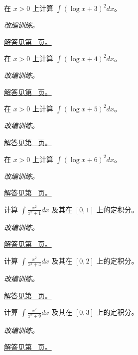 \documentclass[UTF8,12pt,a4paper,fontset=fandol]{ctexart}
\begin{document}
\begin{example}[对数平方的分部积分]\label{ex:c15q15}
在 $x>0$ 上计算 $\displaystyle\int(\log x+3)^2dx$。
\par\textit{改编训练。}\par\hyperref[ans:c15q15]{解答见第~\pageref{ans:c15q15} 页。}
\end{example}
\begin{example}[对数平方的分部积分]\label{ex:c15q16}
在 $x>0$ 上计算 $\displaystyle\int(\log x+4)^2dx$。
\par\textit{改编训练。}\par\hyperref[ans:c15q16]{解答见第~\pageref{ans:c15q16} 页。}
\end{example}
\begin{example}[对数平方的分部积分]\label{ex:c15q17}
在 $x>0$ 上计算 $\displaystyle\int(\log x+5)^2dx$。
\par\textit{改编训练。}\par\hyperref[ans:c15q17]{解答见第~\pageref{ans:c15q17} 页。}
\end{example}
\begin{example}[对数平方的分部积分]\label{ex:c15q18}
在 $x>0$ 上计算 $\displaystyle\int(\log x+6)^2dx$。
\par\textit{改编训练。}\par\hyperref[ans:c15q18]{解答见第~\pageref{ans:c15q18} 页。}
\end{example}
\begin{example}[先拆分再积分的有理式]\label{ex:c15q19}
计算 $\displaystyle\int\frac{x^2}{x^2+1}dx$ 及其在 $[0,1]$ 上的定积分。
\par\textit{改编训练。}\par\hyperref[ans:c15q19]{解答见第~\pageref{ans:c15q19} 页。}
\end{example}
\begin{example}[先拆分再积分的有理式]\label{ex:c15q20}
计算 $\displaystyle\int\frac{x^2}{x^2+4}dx$ 及其在 $[0,2]$ 上的定积分。
\par\textit{改编训练。}\par\hyperref[ans:c15q20]{解答见第~\pageref{ans:c15q20} 页。}
\end{example}
\begin{example}[先拆分再积分的有理式]\label{ex:c15q21}
计算 $\displaystyle\int\frac{x^2}{x^2+9}dx$ 及其在 $[0,3]$ 上的定积分。
\par\textit{改编训练。}\par\hyperref[ans:c15q21]{解答见第~\pageref{ans:c15q21} 页。}
\end{example}
\end{document}

